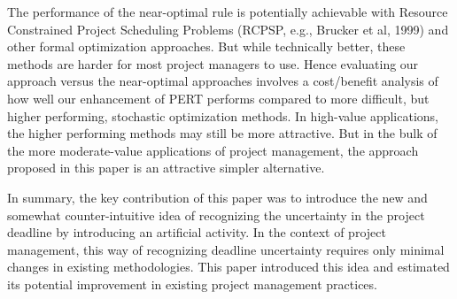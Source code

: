 \documentclass[11pt]{article}
\begin{document}
The performance of the  near-optimal rule is potentially achievable with Resource Constrained Project Scheduling Problems (RCPSP, e.g., Brucker et al, 1999) and other formal optimization approaches.  But while technically better, these methods are harder for most project managers to use. Hence evaluating our approach versus the near-optimal approaches involves a cost/benefit analysis of how well our enhancement of PERT performs compared to more difficult, but higher performing, stochastic optimization methods.  In high-value applications, the higher performing methods may still be more attractive. But in the bulk of the more moderate-value applications of project management, the approach proposed in this paper is an attractive simpler alternative.  \par
In summary, the key contribution of this paper was to introduce the new
and somewhat counter-intuitive idea of recognizing the uncertainty in the project deadline by introducing an artificial activity.  In the context of project management, this way of recognizing deadline uncertainty requires only minimal changes in existing methodologies.  This paper introduced this idea and estimated its potential improvement in existing project management practices.
\end{document}
